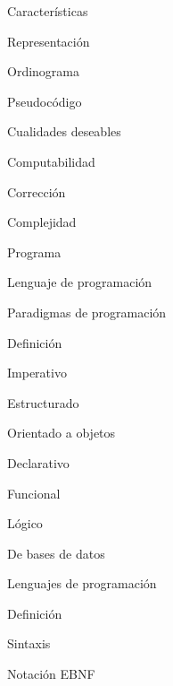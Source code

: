 \begin{longenum}
\begin{longenum}
\begin{longenum}
\begin{longenum}
                \item Características
                \item Representación
                \begin{longenum}
                    \item Ordinograma
                    \item Pseudocódigo
                \end{longenum}
                \item Cualidades deseables
                \item Computabilidad
                \item Corrección
                \item Complejidad
            \end{longenum}
            \item Programa
            \item Lenguaje de programación
        \end{longenum}
        \item Paradigmas de programación
        \begin{longenum}
            \item Definición
            \item Imperativo
            \begin{longenum}
                \item Estructurado
                \item Orientado a objetos
            \end{longenum}
            \item Declarativo
            \begin{longenum}
                \item Funcional
                \item Lógico
                \item De bases de datos
            \end{longenum}
        \end{longenum}
        \item Lenguajes de programación
        \begin{longenum}
            \item Definición
            \begin{longenum}
                \item Sintaxis
                \begin{longenum}
                    \item Notación EBNF

\end{longenum}
\end{longenum}
\end{longenum}
\end{longenum}
\end{longenum}
